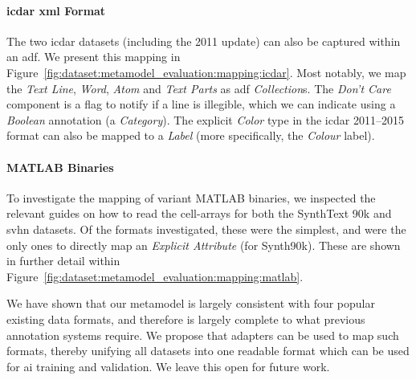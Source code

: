 \paragraph{\gls{icdar} \gls{xml} Format}

The two \gls{icdar} datasets (including the 2011 update) can also be captured within an \gls{adf}. We present this mapping in Figure~\ref{fig:dataset:metamodel_evaluation:mapping:icdar}. Most notably, we map the \textit{Text Line}, \textit{Word}, \textit{Atom} and \textit{Text Parts} as \gls{adf} \textit{Collection}s. The \textit{Don't Care} component is a flag to notify if a line is illegible, which we can indicate using a \textit{Boolean} annotation (a \textit{Category}). The explicit \textit{Color} type in the \gls{icdar} 2011--2015 format can also be mapped to a \textit{Label} (more specifically, the \textit{Colour} label).

\paragraph{MATLAB Binaries}

To investigate the mapping of variant MATLAB binaries, we inspected the relevant guides on how to read the cell-arrays for both the SynthText 90k and \gls{svhn} datasets. Of the formats investigated, these were the simplest, and were the only ones to directly map an \textit{Explicit Attribute} (for Synth90k). These are shown in further detail within Figure~\ref{fig:dataset:metamodel_evaluation:mapping:matlab}.


\bigskip
\noindent
We have shown that our metamodel is largely consistent with four popular existing data formats, and therefore is largely complete to what previous annotation systems require. We propose that adapters can be used to map such formats, thereby unifying all datasets into one readable format which can be used for \gls{ai} training and validation. We leave this open for future work.


